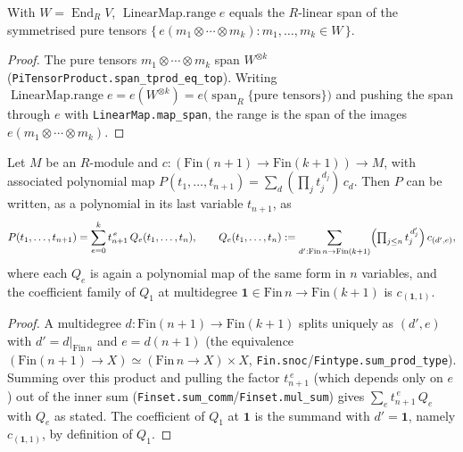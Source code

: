 \begin{lemma}
    \label{lem:range-e-spanned}
    \leanok
    With $W = \operatorname{End}_R V$, $\operatorname{LinearMap.range} e$ equals the $R$-linear span of the
    symmetrised pure tensors $\{\, e(m_1 \otimes \cdots \otimes m_k) : m_1, \ldots, m_k \in W \,\}$.
\end{lemma}
\begin{proof}
    The pure tensors $m_1 \otimes \cdots \otimes m_k$ span $W^{\otimes k}$
    (\texttt{PiTensorProduct.span\_tprod\_eq\_top}). Writing
    $\operatorname{LinearMap.range} e = e(W^{\otimes k}) = e\bigl(\operatorname{span}_R\{\text{pure tensors}\}\bigr)$
    and pushing the span through $e$ with \texttt{LinearMap.map\_span}, the range is the span of the images
    $e(m_1 \otimes \cdots \otimes m_k)$.
\end{proof}

\begin{lemma}
    \label{lem:polarization-regroup}
    Let $M$ be an $R$-module and $c : (\mathrm{Fin}(n{+}1) \to \mathrm{Fin}(k+1)) \to M$, with associated
    polynomial map $P(t_1, \ldots, t_{n+1}) = \sum_{d} (\prod_{j} t_j^{\,d_j})\, c_d$. Then $P$ can be
    written, as a polynomial in its last variable $t_{n+1}$, as
    \[
        P(t_1, \ldots, t_{n+1}) = \sum_{e=0}^{k} t_{n+1}^{\,e}\, Q_e(t_1, \ldots, t_n),
        \qquad
        Q_e(t_1, \ldots, t_n) := \sum_{d' : \mathrm{Fin}\,n \to \mathrm{Fin}(k+1)}
            \Bigl(\textstyle\prod_{j \le n} t_j^{\,d'_j}\Bigr)\, c_{(d', e)},
    \]
    where each $Q_e$ is again a polynomial map of the same form in $n$ variables, and the coefficient family
    of $Q_1$ at multidegree $\mathbf 1 \in \mathrm{Fin}\,n \to \mathrm{Fin}(k+1)$ is $c_{(\mathbf 1, 1)}$.
\end{lemma}
\begin{proof}
    A multidegree $d : \mathrm{Fin}(n{+}1) \to \mathrm{Fin}(k+1)$ splits uniquely as $(d', e)$ with
    $d' = d|_{\mathrm{Fin}\,n}$ and $e = d(n{+}1)$ (the equivalence $(\mathrm{Fin}(n{+}1) \to X) \simeq
    (\mathrm{Fin}\,n \to X) \times X$, \texttt{Fin.snoc}/\texttt{Fintype.sum\_prod\_type}). Summing over
    this product and pulling the factor $t_{n+1}^{\,e}$ (which depends only on $e$) out of the inner sum
    (\texttt{Finset.sum\_comm}/\texttt{Finset.mul\_sum}) gives $\sum_e t_{n+1}^{\,e}\, Q_e$ with $Q_e$ as
    stated. The coefficient of $Q_1$ at $\mathbf 1$ is the summand with $d' = \mathbf 1$, namely
    $c_{(\mathbf 1, 1)}$, by definition of $Q_1$.
\end{proof}

